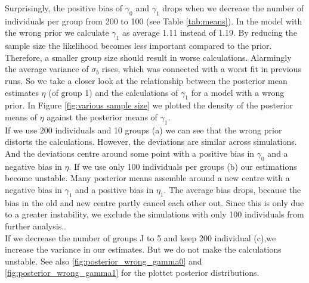 Surprisingly, the positive bias of $\gamma_0$ and $\gamma_1$ drops when we decrease the number of individuals per group from 200 to 100 (see Table \ref{tab:means}). In the model with the wrong prior we calculate $\gamma_1$  as average 1.11 instead of 1.19. 
By reducing the sample size the likelihood becomes less important compared to the prior. Therefore, a smaller group size should result in worse calculations. Alarmingly the average variance of $\sigma_b$ rises, which was connected with a worst fit in previous runs. So we take a closer look at the relationship between the posterior mean estimates $\eta$ (of group 1) and the calculations of $\gamma_1$ for a model with a wrong prior.
In Figure \ref{fig:various sample size} we plotted the density of the posterior means of $\eta$ against the posterior means of $\gamma_1$. \\
If we use 200 individuals and 10 groups (a) we can see that the wrong prior distorts the calculations. However, the deviations are similar across simulations. And the deviations centre around some point with a positive bias in $\gamma_0$ and a negative bias in $\eta$.
If we use only 100 individuals per groups (b) our estimations become unstable. Many posterior means assemble around a new centre with a negative bias in $\gamma_1$ and a positive bias in $\eta_1$. The average bias drops, because the bias in the old and new centre partly cancel each other out. Since this is only due to a greater instability, we exclude the simulations with only 100 individuals from further analysis..\\
If we decrease the number of groups J to 5 and keep 200 individual (c),we increase the variance in our estimates.  But we do not make the calculations unstable.
See also \ref{fig:posterior_wrong_gamma0} and \ref{fig:posterior_wrong_gamma1} for the plottet posterior distributions. 

